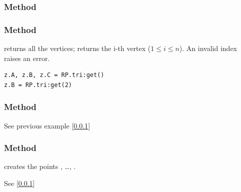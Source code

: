 \subsubsection{Method }
\label{ssub:function_regular_new}

\begin{tkzexample}[latex=.5\textwidth]

\end{tkzexample}

\subsubsection{Method }
\label{ssub:method_regular_get}

 returns all the vertices;  returns the i-th vertex ($1 \le i \le n$). An invalid index raises an error.

\begin{verbatim}
z.A, z.B, z.C = RP.tri:get()
z.B = RP.tri:get(2)
\end{verbatim}

\subsubsection{Method }
\label{ssub:method_regular_incircle}

See  previous example [\ref{ssub:function_regular_new}]

\subsubsection{Method }
\label{ssub:method_regular_name}

 creates the points , \ldots, .

See   [\ref{ssub:function_regular_new}]
\endinput